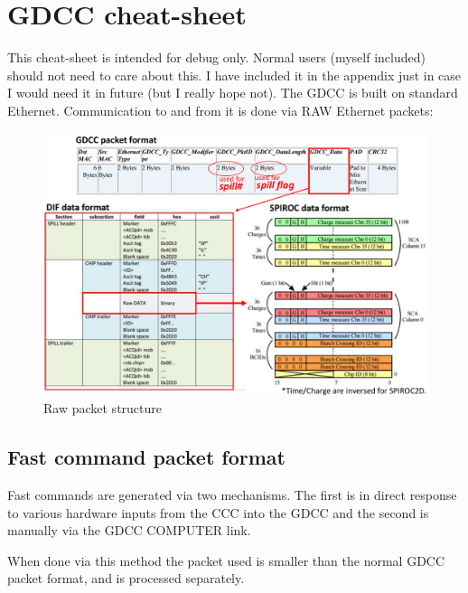 \section{GDCC cheat-sheet}\label{sec:gdcc-cheat-sheet}
This cheat-sheet is intended for debug only. Normal users (myself included)
should not need to care about this. I have included it in the appendix just in
case I would need it in future (but I really hope not). The GDCC is built on
standard Ethernet. Communication to and from it is done via RAW Ethernet
packets:
\begin{figure}[H]
  \centering \includegraphics[width=\linewidth]{raw-packet}
  \caption{Raw packet structure}\label{fig:raw-packet}
\end{figure}
\subsection{Fast command packet format}
Fast commands are generated via two mechanisms. The first is in direct response
to various hardware inputs from the CCC into the GDCC and the second is manually
via the GDCC \textrightarrow COMPUTER link.

When done via this method the packet used is smaller than the normal GDCC packet
format, and is processed separately.
\begin{table}[H]
  \centering {}
  \caption{Fast command packet format}
\end{table}

